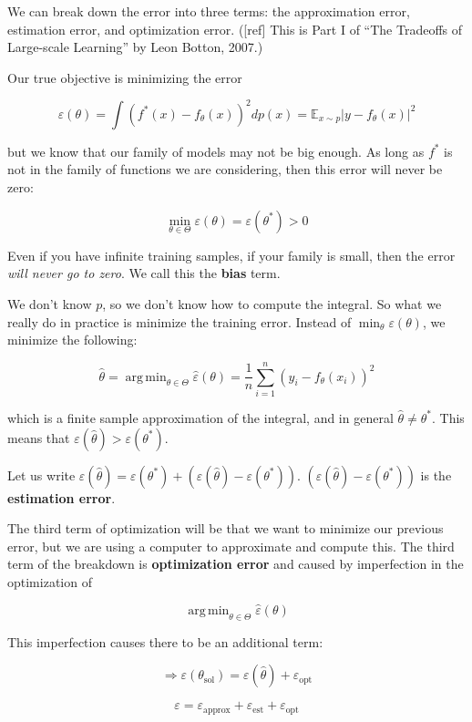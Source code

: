 \documentclass[12pt]{article}
\theoremstyle{plain}
\DeclareMathOperator*{\argmin}{arg\,min}
\begin{document}
We can break down the error into three terms: the approximation error, estimation error, and optimization error. ([ref] This is Part I of ``The Tradeoffs of Large-scale Learning'' by Leon Botton, 2007.)

Our true objective is minimizing the error

$$ \varepsilon(\theta) = \int (f^*(x) - f_\theta(x))^2 d p(x)  = \mathbb{E}_{x \sim p} |y-f_\theta(x)|^2$$

but we know that our family of models may not be big enough. As long as $f^*$ is not in the family of functions we are considering, then this error will never be zero:

$$ \min_{\theta \in \Theta} \varepsilon(\theta) = \varepsilon(\theta^*) > 0 $$

Even if you have infinite training samples, if your family is small, then the error \textit{will never go to zero}. We call this the \textbf{bias} term.

We don't know $p$, so we don't know how to compute the integral. So what we really do in practice is minimize the training error. Instead of $\min_\theta \varepsilon(\theta)$, we minimize the following:

$$ \hat{\theta} = \argmin_{\theta \in \Theta} \hat{\varepsilon} (\theta ) = \frac{1}{n} \sum_{i=1}^n (y_i - f_\theta(x_i))^2 $$

which is a finite sample approximation of the integral, and in general $\hat{\theta} \neq \theta^*$. This means that $\varepsilon(\hat{\theta}) > \varepsilon(\theta^*)$.

Let us write $\varepsilon(\hat{\theta}) = \varepsilon(\theta^*) + (\varepsilon(\hat{\theta}) - \varepsilon(\theta^*))$. $(\varepsilon(\hat{\theta}) - \varepsilon(\theta^*))$ is the \textbf{estimation error}.

The third term of optimization will be that we want to minimize our previous error, but we are using a computer to approximate and compute this. The third term of the breakdown is \textbf{optimization error} and caused by imperfection in the optimization of

$$ \argmin_{\theta \in \Theta} \hat{\varepsilon}(\theta) $$

This imperfection causes there to be an additional term:

$$ \Rightarrow \varepsilon(\theta_{\text{sol}}) = \varepsilon(\hat{\theta}) + \varepsilon_\text{opt} $$

$$\varepsilon = \varepsilon_\text{approx} + \varepsilon_\text{est} + \varepsilon_\text{opt} $$
\end{document}
